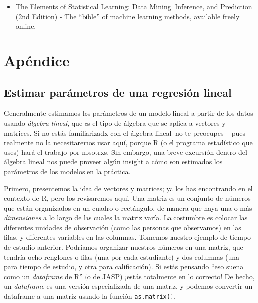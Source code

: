 \documentclass[
  12pt,
]{book}
\providecommand{\tightlist}{%
  \setlength{\itemsep}{0pt}\setlength{\parskip}{0pt}}
\theoremstyle{definition}
\theoremstyle{definition}
\theoremstyle{definition}
\theoremstyle{remark}
\begin{document}
\begin{itemize}
\tightlist
\item
  \href{https://web.stanford.edu/~hastie/Papers/ESLII.pdf}{The Elements of Statistical Learning: Data Mining, Inference, and Prediction (2nd Edition)} - The ``bible'' of machine learning methods, available freely online.
\end{itemize}

\hypertarget{apuxe9ndice}{%
\section{Apéndice}\label{apuxe9ndice}}

\hypertarget{estimar-paruxe1metros-de-una-regresiuxf3n-lineal}{%
\subsection{Estimar parámetros de una regresión lineal}\label{estimar-paruxe1metros-de-una-regresiuxf3n-lineal}}

Generalmente estimamos los parámetros de un modelo lineal a partir de los datos usando \emph{álgebra lineal}, que es el tipo de álgebra que se aplica a vectores y matrices. Si no estás familiarizadx con el álgebra lineal, no te preocupes -- pues realmente no la necesitaremos usar aquí, porque R (o el programa estadístico que uses) hará el trabajo por nosotrxs. Sin embargo, una breve excursión dentro del álgebra lineal nos puede proveer algún insight a cómo son estimados los parámetros de los modelos en la práctica.

Primero, presentemos la idea de vectores y matrices; ya los has encontrando en el contexto de R, pero los revisaremos aquí. Una matriz es un conjunto de números que están organizados en un cuadro o rectángulo, de manera que haya una o más \emph{dimensiones} a lo largo de las cuales la matriz varía. La costumbre es colocar las diferentes unidades de observación (como las personas que observamos) en las filas, y diferentes variables en las columnas. Tomemos nuestro ejemplo de tiempo de estudio anterior. Podríamos organizar nuestros números en una matriz, que tendría ocho renglones o filas (una por cada estudiante) y dos columnas (una para tiempo de estudio, y otra para calificación). Si estás pensando ``eso suena como un \emph{dataframe} de R'' (o de JASP) ¡estás totalmente en lo correcto! De hecho, un \emph{dataframe} es una versión especializada de una matriz, y podemos convertir un dataframe a una matriz usando la función \texttt{as.matrix()}.
\end{document}
